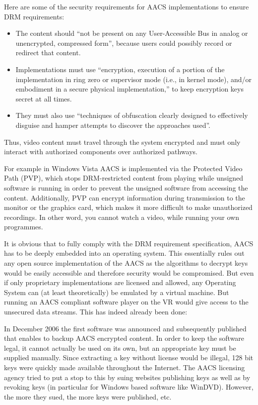 Here are some of the security requirements for AACS implementations to ensure
DRM requirements:
\begin{itemize}\itemsep0pt
\item The content should ``not be present on any User-Accessible Bus in analog
  or unencrypted, compressed form'', because users could possibly record or
  redirect that content.
\item Implementations must use ``encryption, execution of a portion of the
  implementation in ring zero or supervisor mode (i.e., in kernel mode), and/or
  embodiment in a secure physical implementation,'' to keep encryption keys
  secret at all times.
\item They must also use ``techniques of obfuscation clearly designed to
  effectively disguise and hamper attempts to discover the approaches used''.
\end{itemize}
Thus, video content must travel through the system encrypted and must only
interact with authorized components over authorized pathways.

For example in Windows Vista AACS is implemented via the Protected Video Path
(PVP), which stops DRM-restricted content from playing while unsigned software
is running in order to prevent the unsigned software from accessing the
content. Additionally, PVP can encrypt information during transmission to the
monitor or the graphics card, which makes it more difficult to make unauthorized
recordings. In other word, you cannot watch a video, while running your own
programmes.
\newpage


It is obvious that to fully comply with the DRM requirement specification, AACS
has to be deeply embedded into an operating system. This essentially rules out
any open source implementation of the AACS as the algorithms to decrypt keys
would be easily accessible and therefore security would be compromised. But even
if only proprietary implementations are licensed and allowed, any Operating
System can (at least theoretically) be emulated by a virtual machine. But
running an AACS compliant software player on the VR would give access to the
unsecured data streams. This has indeed already been done:

In December 2006 the first software was announced and subsequently published
that enables to backup AACS encrypted content. In order to keep the software
legal, it cannot actually be used on its own, but an appropriate key must be
supplied manually. Since extracting a key without license would be illegal, 128
bit keys were quickly made available throughout the Internet. The AACS licensing
agency tried to put a stop to this by suing websites publishing keys as well as
by revoking keys (in particular for Windows based software like WinDVD).
However, the more they sued, the more keys were published, etc.

